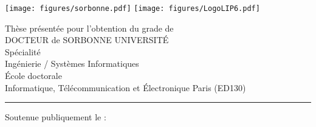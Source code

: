 %

\newcommand{\jurymember}[5]{\hspace{1.5em}\textbf{{#1} \textsc{{#2}}}, { \scriptsize  #3}, { \scriptsize  #4} \hfill \textit{{#5}}\\}

\begin{titlepage}
	\begin{flushleft}
      \texttt{[image: figures/sorbonne.pdf]}
      \hfill
      \texttt{[image: figures/LogoLIP6.pdf]}
	\end{flushleft}
	\vfill
	\begin{center}
        \vspace{1em}
        {\large Thèse présentée pour l'obtention du grade de}\\
        \vspace{1em}
        {\LARGE DOCTEUR de SORBONNE UNIVERSITÉ}\\
        \vspace{2em}
		{\small Spécialité}\\
		\vspace{0.5em}
		{\Large Ingénierie / Systèmes Informatiques}\\
		\vspace{2em}
        {\large École doctorale}\\
		\vspace{0.5em}
		{\Large Informatique, Télécommunication et Électronique Paris (ED130)}\\
    \end{center}
	\vfill
	\begin{flushright}
	\hfill
	\vfill
	{\LARGE\thesisTitle \par}
	\rule[5pt]{\textwidth}{.4pt} \par
	{\Large\thesisName}
	\vfill
	\end{flushright}
	Soutenue publiquement le : \textit{\large\thesisDate}

\end{titlepage}
